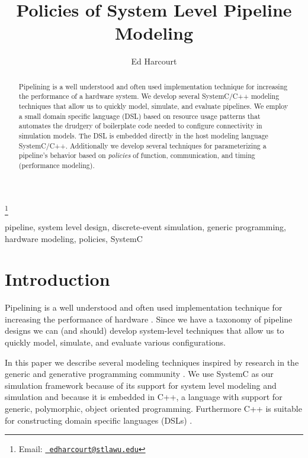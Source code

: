 \documentclass{entcs}
\begin{document}
\begin{frontmatter}
\title{Policies of System Level Pipeline Modeling}
 \author{Ed Harcourt}
  \address{Department of Mathematics, Computer Science, and Statistics \\
           St. Lawrence University\\
           Canton, NY USA}
    \thanks[myemail]{Email:
    \href{mailto:edharcourt@stlawu.edu} {\texttt{\normalshape
        edharcourt@stlawu.edu}}}
\begin{abstract}
Pipelining is a well understood and often used implementation
technique for increasing the performance of a hardware system.
We develop several SystemC/C++
modeling techniques that allow us to quickly model, simulate, and
evaluate pipelines. We employ a small
domain specific language (DSL) based on resource usage patterns that
automates the drudgery of boilerplate code
needed to configure connectivity in simulation models. The
DSL is embedded directly in the host
modeling language SystemC/C++. Additionally we develop
several techniques for parameterizing a pipeline's behavior based
on {\em policies} of function, communication, and timing (performance modeling).
\end{abstract}
\begin{keyword}
  pipeline, system level design, discrete-event simulation, generic programming, hardware modeling, policies, SystemC
\end{keyword}
\end{frontmatter}



\section{\label{sec:intro}Introduction}
Pipelining is a well understood and often used implementation
technique for increasing the performance of hardware
\cite{kogge81,hwang84}. Since we have a taxonomy of pipeline designs
we can (and should) develop system-level
techniques that allow us to quickly model, simulate, and evaluate
various configurations.

In this paper we describe several modeling techniques inspired by
research in the generic and generative programming community
\cite{GPCE07,Czarnecki}. We use
SystemC \cite{systemc:lrm,glms:systemc} as our simulation framework
because of its support for system level modeling and simulation
and because it is
embedded in C++, a language with support for generic,
polymorphic, object oriented programming. Furthermore C++ is suitable
for constructing domain specific languages (DSLs) \cite{Abrahams05,Alexandrescu01}.
\end{document}
